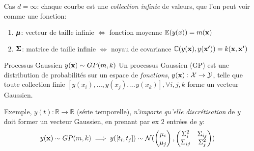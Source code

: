 \documentclass[xcolor=svgnames, t]{beamer}
\newcommand{\vectorx}[1]{\boldsymbol{\MakeLowercase{\mathbf{#1}}}}
\newcommand{\matrixx}[1]{\boldsymbol{\MakeUppercase{#1}}}
\newcommand{\coloredemph}[1]{\textcolor{internationalblue}{\emph{#1}}}
\begin{document}
\begin{frame}
  \frametitle{\secname}
  Cas $d=\infty$: chaque courbe est une \coloredemph{collection infinie} de valeurs, que l'on peut voir comme une fonction:
  \begin{enumerate}
    \item $\vectorx{\mu}$: vecteur de taille infinie $\Leftrightarrow$ fonction moyenne $\mathbb{E}(y(x)) = m(\vectorx{x})$
    \item $\matrixx{\Sigma}$: matrice de taille infinie $\Leftrightarrow$  noyau de covariance 
    $\mathbb{C}( y(\vectorx{x}), y(\vectorx{x^\prime}) ) = k(\vectorx{x}, \vectorx{x^{\prime}})$
  \end{enumerate}
  \pause
  \begin{block}{Processus Gaussien $y(\vectorx{x}) \sim GP(m, k)$}
    Un processus Gaussien (GP) est une distribution de probabilités sur un espace de \coloredemph{fonctions},
    $y(\vectorx{x}): \mathcal{X} \to \mathcal{Y}$, telle que toute collection finie
    $[ y(x_i), \dots, y(x_j), \dots y(x_k) ], \forall i,j,k$ forme un vecteur Gaussien. 
  \end{block}
  \pause
  Exemple, $y(t): \mathbb{R} \to \mathbb{R}$ (série temporelle), \coloredemph{n'importe qu'elle discrétisation} de $y$ doit
   former un vecteur Gaussien, en prenant par ex $2$ entrées de $y$:
  \begin{equation*}
    y(\vectorx{x}) \sim GP(m, k) \implies
    y([t_i, t_j]) \sim \mathcal{N} (
      \begin{pmatrix}
        \mu_i \\
        \mu_j 
      \end{pmatrix},
      \begin{pmatrix}
        \Sigma_{i}^2 & \Sigma_{ij} \\
        \Sigma_{ij} & \Sigma_{j}^2
      \end{pmatrix}
      )
  \end{equation*}
\end{frame}
\end{document}
